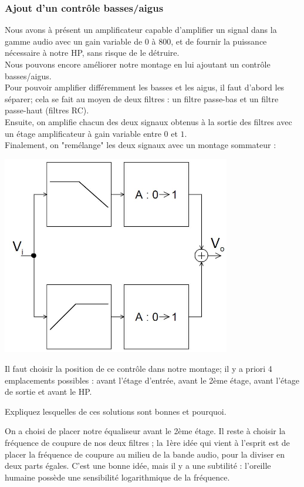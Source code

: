 \documentclass{../template/labo}
\begin{document}
\subsubsection{Ajout d'un contrôle basses/aigus}
Nous avons à présent un amplificateur capable d'amplifier un signal dans la gamme audio avec un gain variable de $0$ à $800$, et de fournir la puissance nécessaire à notre HP, sans risque de le détruire.\\
Nous pouvons encore améliorer notre montage en lui ajoutant un contrôle basses/aigus.\\
Pour pouvoir amplifier différemment les basses et les aigus, il faut d'abord les séparer; cela se fait au moyen de deux filtres : un filtre passe-bas et un filtre passe-haut (filtres RC).\\
Ensuite, on amplifie chacun des deux signaux obtenus à la sortie des filtres avec un étage amplificateur à gain variable entre $0$ et $1$.\\
Finalement, on "remélange" les deux signaux avec un montage sommateur :
\begin{center}
\includegraphics[width=10cm]{figures/AOPsommateur}
\end{center}

Il faut choisir la position de ce contrôle dans notre montage; il y a priori 4 emplacements possibles : avant l'étage d'entrée, avant le 2ème étage, avant l'étage de sortie et avant le HP.

\Question
{
Expliquez lesquelles de ces solutions sont bonnes et pourquoi.
}
{}

On a choisi de placer notre équaliseur avant le 2ème étage.
Il reste à choisir la fréquence de coupure de nos deux filtres ; la 1ère idée qui vient à l'esprit est de placer la fréquence de coupure au milieu de la bande audio, pour la diviser en deux parts égales.
C'est une bonne idée, mais il y a une subtilité : l'oreille humaine possède une sensibilité logarithmique de la fréquence.
\end{document}
